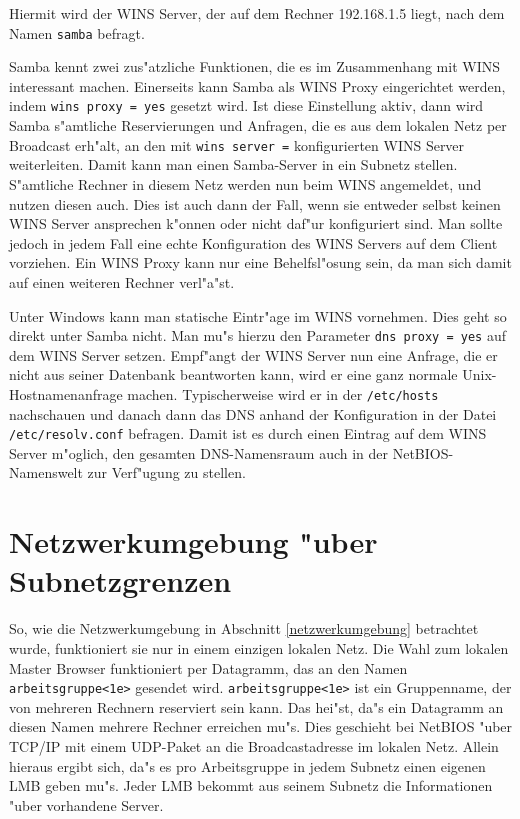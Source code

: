 \documentclass{scrartcl}
\newcommand{\prog}{\texttt}
\newcommand{\param}{\texttt}
\newcommand{\datei}{\texttt}
\newcommand{\nbname}{\texttt}
\begin{document}
Hiermit wird der WINS Server, der auf dem Rechner 192.168.1.5 liegt,
nach dem Namen \nbname{samba} befragt.

Samba kennt zwei zus"atzliche Funktionen, die es im Zusammenhang mit
WINS interessant machen. Einerseits kann Samba als WINS Proxy
eingerichtet werden, indem \param{wins proxy = yes} gesetzt wird. Ist
diese Einstellung aktiv, dann wird Samba s"amtliche Reservierungen und
Anfragen, die es aus dem lokalen Netz per Broadcast erh"alt, an den
mit \prog{wins server =} konfigurierten WINS Server weiterleiten.
Damit kann man einen Samba-Server in ein Subnetz stellen. S"amtliche
Rechner in diesem Netz werden nun beim WINS angemeldet, und nutzen
diesen auch. Dies ist auch dann der Fall, wenn sie entweder selbst
keinen WINS Server ansprechen k"onnen oder nicht daf"ur konfiguriert
sind. Man sollte jedoch in jedem Fall eine echte Konfiguration des
WINS Servers auf dem Client vorziehen. Ein WINS Proxy kann nur eine
Behelfsl"osung sein, da man sich damit auf einen weiteren
Rechner verl"a"st.

Unter Windows kann man statische Eintr"age im WINS vornehmen. Dies
geht so direkt unter Samba nicht. Man mu"s hierzu den Parameter
\param{dns proxy = yes} auf dem WINS Server setzen. Empf"angt der WINS
Server nun eine Anfrage, die er nicht aus seiner Datenbank beantworten
kann, wird er eine ganz normale Unix-Hostnamenanfrage machen.
Typischerweise wird er in der \datei{/etc/hosts} nachschauen und
danach dann das DNS anhand der Konfiguration in der Datei
\datei{/etc/resolv.conf} befragen. Damit ist es durch einen Eintrag
auf dem WINS Server m"oglich, den gesamten DNS-Namensraum auch in der
NetBIOS-Namenswelt zur Verf"ugung zu stellen.

\section{Netzwerkumgebung "uber Subnetzgrenzen}

So, wie die Netzwerkumgebung in Abschnitt \ref{netzwerkumgebung}
betrachtet wurde, funktioniert sie nur in einem einzigen lokalen
Netz. Die Wahl zum lokalen Master Browser funktioniert per Datagramm,
das an den Namen \nbname{arbeitsgruppe<1e>} gesendet
wird. \nbname{arbeitsgruppe<1e>} ist ein Gruppenname, der von mehreren
Rechnern reserviert sein kann. Das hei"st, da"s ein Datagramm an
diesen Namen mehrere Rechner erreichen mu"s. Dies geschieht bei
NetBIOS "uber TCP/IP mit einem UDP-Paket an die Broadcastadresse im
lokalen Netz. Allein hieraus ergibt sich, da"s es pro Arbeitsgruppe in
jedem Subnetz einen eigenen LMB geben mu"s. Jeder LMB bekommt aus
seinem Subnetz die Informationen "uber vorhandene Server.
\end{document}
